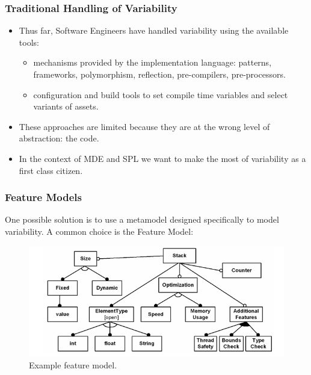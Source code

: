 \documentclass{beamer}
\begin{document}
\begin{frame}
\frametitle{Traditional Handling of Variability}

\begin{itemize}

\item Thus far, Software Engineers have handled variability using the
  available tools:

  \pause

  \begin{itemize}

  \item mechanisms provided by the implementation language: patterns,
    frameworks, polymorphism, reflection, pre-compilers,
    pre-processors.

    \pause

  \item configuration and build tools to set compile time variables
    and select variants of assets.

  \end{itemize}

  \pause

\item These approaches are limited because they are at the wrong level
  of abstraction: the code.

\pause

\item In the context of \ac{MDE} and \ac{SPL} we want to make the most
  of variability as a first class citizen.

\end{itemize}

\end{frame}

\begin{frame}
\frametitle{Feature Models}

One possible solution is to use a metamodel designed specifically to
model variability. A common choice is the Feature
Model\cite{czarnecki2000generative}:

\begin{figure}
  \centering
  \includegraphics[scale=0.4]{images/example_feature_model_voelter.png}
  \caption{Example feature model.\cite{groher2007expressing}}
\end{figure}

\end{frame}
\end{document}

